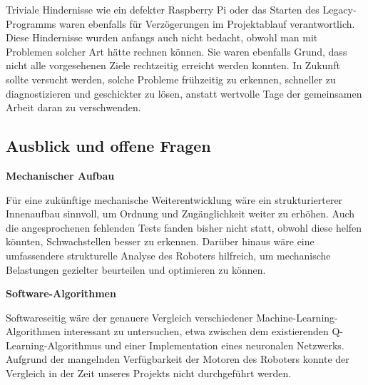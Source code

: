 Triviale Hindernisse wie ein defekter Raspberry Pi oder das Starten des Legacy-Programms waren ebenfalls für Verzögerungen im Projektablauf verantwortlich. Diese Hindernisse wurden anfangs auch nicht bedacht, obwohl man mit Problemen solcher Art hätte rechnen können. Sie waren ebenfalls Grund, dass nicht alle vorgesehenen Ziele rechtzeitig erreicht werden konnten. In Zukunft sollte versucht werden, solche Probleme frühzeitig zu erkennen, schneller zu diagnostizieren und geschickter zu lösen, anstatt wertvolle Tage der gemeinsamen Arbeit daran zu verschwenden.

\subsection{Ausblick und offene Fragen}

\textbf{Mechanischer Aufbau}

Für eine zukünftige mechanische Weiterentwicklung wäre ein strukturierterer Innenaufbau sinnvoll, um Ordnung und Zugänglichkeit weiter zu erhöhen. Auch die angesprochenen fehlenden Tests fanden bisher nicht statt, obwohl diese helfen könnten, Schwachstellen besser zu erkennen. Darüber hinaus wäre eine umfassendere strukturelle Analyse des Roboters hilfreich, um mechanische Belastungen gezielter beurteilen und optimieren zu können.

\textbf{Software-Algorithmen}

Softwareseitig wäre der genauere Vergleich verschiedener Machine-Learning-Algorithmen interessant zu untersuchen, etwa zwischen dem existierenden Q-Learning-Algorithmus und einer Implementation eines neuronalen Netzwerks. Aufgrund der mangelnden Verfügbarkeit der Motoren des Roboters konnte der Vergleich in der Zeit unseres Projekts nicht durchgeführt werden.


